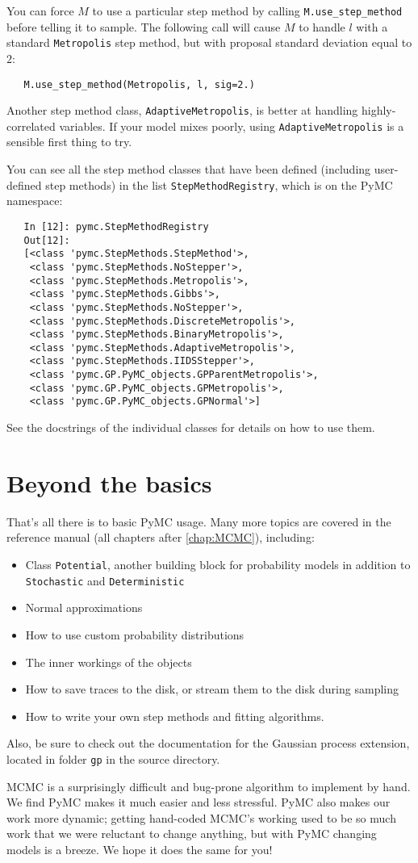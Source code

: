 You can force $M$ to use a particular step method by calling \texttt{M.use_step_method} before telling it to sample. The following call will cause $M$ to handle $l$ with a standard \texttt{Metropolis} step method, but with proposal standard deviation equal to $2$:
\begin{verbatim}
   M.use_step_method(Metropolis, l, sig=2.)
\end{verbatim}

Another step method class, \texttt{AdaptiveMetropolis}, is better at handling highly-correlated variables. If your model mixes poorly, using \texttt{AdaptiveMetropolis} is a sensible first thing to try.

You can see all the step method classes that have been defined (including user-defined step methods) in the list \texttt{StepMethodRegistry}, which is on the PyMC namespace: 
\begin{verbatim}
   In [12]: pymc.StepMethodRegistry
   Out[12]: 
   [<class 'pymc.StepMethods.StepMethod'>,
    <class 'pymc.StepMethods.NoStepper'>,
    <class 'pymc.StepMethods.Metropolis'>,
    <class 'pymc.StepMethods.Gibbs'>,
    <class 'pymc.StepMethods.NoStepper'>,
    <class 'pymc.StepMethods.DiscreteMetropolis'>,
    <class 'pymc.StepMethods.BinaryMetropolis'>,
    <class 'pymc.StepMethods.AdaptiveMetropolis'>,
    <class 'pymc.StepMethods.IIDSStepper'>,
    <class 'pymc.GP.PyMC_objects.GPParentMetropolis'>,
    <class 'pymc.GP.PyMC_objects.GPMetropolis'>,
    <class 'pymc.GP.PyMC_objects.GPNormal'>]
\end{verbatim}
See the docstrings of the individual classes for details on how to use them.

\section*{Beyond the basics}
That's all there is to basic PyMC usage. Many more topics are covered in the reference manual (all chapters after \ref{chap:MCMC}), including:
\begin{itemize}
   \item Class \texttt{Potential}, another building block for probability models in addition to \texttt{Stochastic} and \texttt{Deterministic}
   \item Normal approximations
   \item How to use custom probability distributions
   \item The inner workings of the objects
   \item How to save traces to the disk, or stream them to the disk during sampling
   \item How to write your own step methods and fitting algorithms.
\end{itemize}
Also, be sure to check out the documentation for the Gaussian process extension, located in folder \texttt{gp} in the source directory. 

\bigskip
MCMC is a surprisingly difficult and bug-prone algorithm to implement by hand. We find PyMC makes it much easier and less stressful. PyMC also makes our work more dynamic; getting hand-coded MCMC's working used to be so much work that we were reluctant to change anything, but with PyMC changing models is a breeze. We hope it does the same for you!